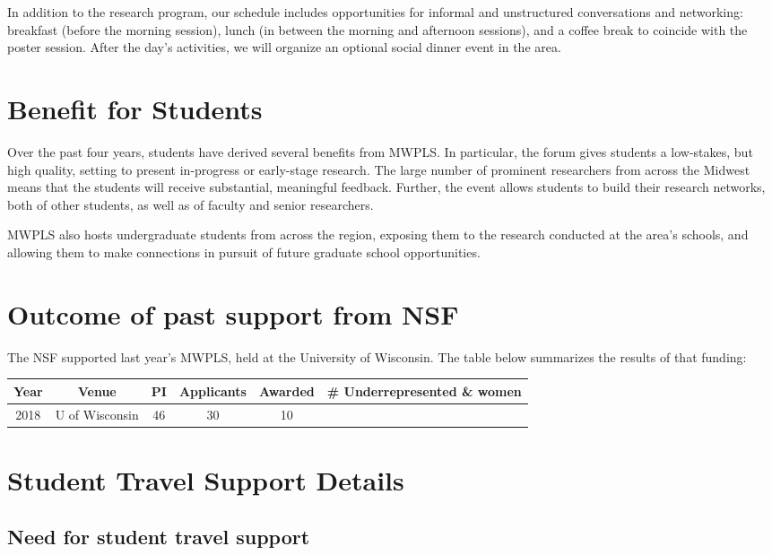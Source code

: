 \documentclass[11pt]{article}
\begin{document}
In addition to the research program, our schedule includes
opportunities for informal and unstructured conversations and
networking: breakfast (before the morning session), lunch (in between
the morning and afternoon sessions), and a coffee break to coincide
with the poster session. After the day's activities, we will organize
an optional social dinner event in the area.

\section{Benefit for Students}

Over the past four years, students have derived several benefits from MWPLS. In particular, the forum gives students a low-stakes, but high quality, setting to present in-progress or early-stage research. The large number of prominent researchers from across the Midwest means that the students will receive substantial, meaningful feedback. Further, the event allows students to build their research networks, both of other students, as well as of faculty and senior researchers.

MWPLS also hosts undergraduate students from across the region, exposing them to the research conducted at the area's schools, and allowing them to make connections in pursuit of future graduate school opportunities.

\section{Outcome of past support from NSF}

The NSF supported last year's MWPLS, held at the University of Wisconsin. The table below summarizes the results of that funding:

\begin{tabular}{cccccc}
	Year & Venue & PI & Applicants & Awarded & \# Underrepresented \& women \\
	\hline
	2018 & U of Wisconsin & 46 & 30 & 10
\end{tabular}

\section{Student Travel Support Details}

\subsection{Need for student travel support}
\end{document}
